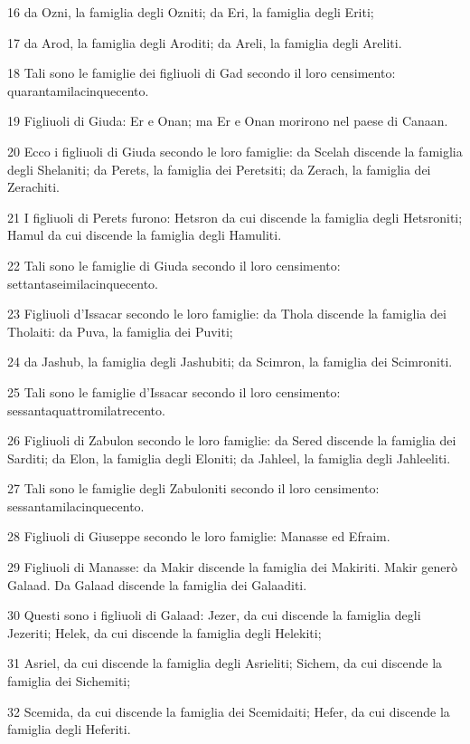 \par 16 da Ozni, la famiglia degli Ozniti; da Eri, la famiglia degli Eriti;
\par 17 da Arod, la famiglia degli Aroditi; da Areli, la famiglia degli Areliti.
\par 18 Tali sono le famiglie dei figliuoli di Gad secondo il loro censimento: quarantamilacinquecento.
\par 19 Figliuoli di Giuda: Er e Onan; ma Er e Onan morirono nel paese di Canaan.
\par 20 Ecco i figliuoli di Giuda secondo le loro famiglie: da Scelah discende la famiglia degli Shelaniti; da Perets, la famiglia dei Peretsiti; da Zerach, la famiglia dei Zerachiti.
\par 21 I figliuoli di Perets furono: Hetsron da cui discende la famiglia degli Hetsroniti; Hamul da cui discende la famiglia degli Hamuliti.
\par 22 Tali sono le famiglie di Giuda secondo il loro censimento: settantaseimilacinquecento.
\par 23 Figliuoli d'Issacar secondo le loro famiglie: da Thola discende la famiglia dei Tholaiti: da Puva, la famiglia dei Puviti;
\par 24 da Jashub, la famiglia degli Jashubiti; da Scimron, la famiglia dei Scimroniti.
\par 25 Tali sono le famiglie d'Issacar secondo il loro censimento: sessantaquattromilatrecento.
\par 26 Figliuoli di Zabulon secondo le loro famiglie: da Sered discende la famiglia dei Sarditi; da Elon, la famiglia degli Eloniti; da Jahleel, la famiglia degli Jahleeliti.
\par 27 Tali sono le famiglie degli Zabuloniti secondo il loro censimento: sessantamilacinquecento.
\par 28 Figliuoli di Giuseppe secondo le loro famiglie: Manasse ed Efraim.
\par 29 Figliuoli di Manasse: da Makir discende la famiglia dei Makiriti. Makir generò Galaad. Da Galaad discende la famiglia dei Galaaditi.
\par 30 Questi sono i figliuoli di Galaad: Jezer, da cui discende la famiglia degli Jezeriti; Helek, da cui discende la famiglia degli Helekiti;
\par 31 Asriel, da cui discende la famiglia degli Asrieliti; Sichem, da cui discende la famiglia dei Sichemiti;
\par 32 Scemida, da cui discende la famiglia dei Scemidaiti; Hefer, da cui discende la famiglia degli Heferiti.
